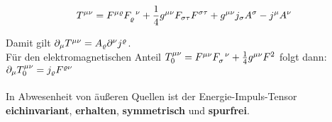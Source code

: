 \begin{align}
T^{\mu\nu} = F^{\mu\varrho}F_{\varrho}^{\phantom{\varrho}\nu} + \frac{1}{4}g^{\mu\nu}F_{\sigma\tau}F^{\sigma\tau} + g^{\mu\nu}j_{\sigma}A^{\sigma} - j^{\mu}A^{\nu}
\end{align}

Damit gilt $\partial_{\mu}T^{\mu\nu} = A_{\varrho}\partial^{\nu}j^{\varrho}$. \\
Für den elektromagnetischen Anteil $T^{\mu\nu}_0 = F^{\mu \nu} F_{\sigma}^{\phantom{\sigma}\nu} + \frac{1}{4}g^{\mu\nu}F^2$ folgt dann: 
$\partial_{\mu}T^{\mu\nu}_0=j_{\varrho}F^{\varrho\nu}$ \\
\vspace{1pt} \\
In Abwesenheit von äußeren Quellen ist der Energie-Impuls-Tensor \textbf{eichinvariant}, \textbf{erhalten}, \textbf{symmetrisch} und \textbf{spurfrei}.
